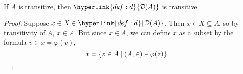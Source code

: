 \documentclass{article}
\newcommand{\named}[1]{\textbf{#1}\index{#1}}
\newcommand{\1}{\mathbbm{1}}
\let\models\vDash
\begin{document}
\begin{prop}
  If $A$ is \hyperlink{def:transitive}{transitive}, then $\hyperlink{def:d}{\mathcal{D}(A)}$ is transitive.
\end{prop}
\begin{proof}
  Suppose $x \in X \in \hyperlink{def:d}{\mathcal{D}(A)}$. Then $x \in X \subseteq A$, so by \hyperlink{def:transitive}{transitivity} of $A$, $x \in A$.
  But since $x \in A$, we can define $x$ as a subset by the formula $v \in x = \varphi(v)$,
  \begin{equation*}
    x = \{z \in A \mid (A,\in) \models \varphi(z)\}. \qedhere
  \end{equation*}
\end{proof}
\end{document}
